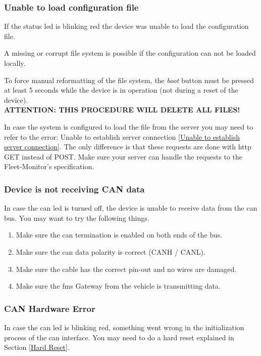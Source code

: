\subsubsection{Unable to load configuration file}
If the status \acrshort{led} is blinking red the device was unable to load the configuration file. 

A missing or corrupt file system is possible if the configuration can not be loaded locally.

To force manual reformatting of the file system, the \textit{boot} button must be pressed at least 5 seconds while the device is in operation (not during a reset of the device).\\
\textbf{ATTENTION: THIS PROCEDURE WILL DELETE ALL FILES!}

In case the system is configured to load the file from the server you may need to refer to the error: Unable to establish server connection \ref{Unable to establish server connection}. The only difference is that these requests are done with \acrshort{http} GET instead of POST. Make sure your server can handle the requests to the Fleet-Monitor's specification.

\subsubsection{Device is not receiving CAN data}
In case the \acrshort{can} \acrshort{led} is turned off, the device is unable to receive data from the \acrshort{can} bus. You may want to try the following things.

\begin{enumerate}
  \item Make sure the \acrshort{can} termination is enabled on both ends of the bus.
  \item Make sure the \acrshort{can} data polarity is correct (CANH / CANL).
  \item Make sure the cable has the correct pin-out and no wires are damaged. 
  \item Make sure the \acrshort{fms} Gateway from the vehicle is transmitting data.
\end{enumerate}

\subsubsection{CAN Hardware Error}
In case the \acrshort{can} \acrshort{led} is blinking red, something went wrong in the initialization process of the \acrshort{can} interface. You may need to do a hard reset explained in Section \ref{Hard Reset}.

